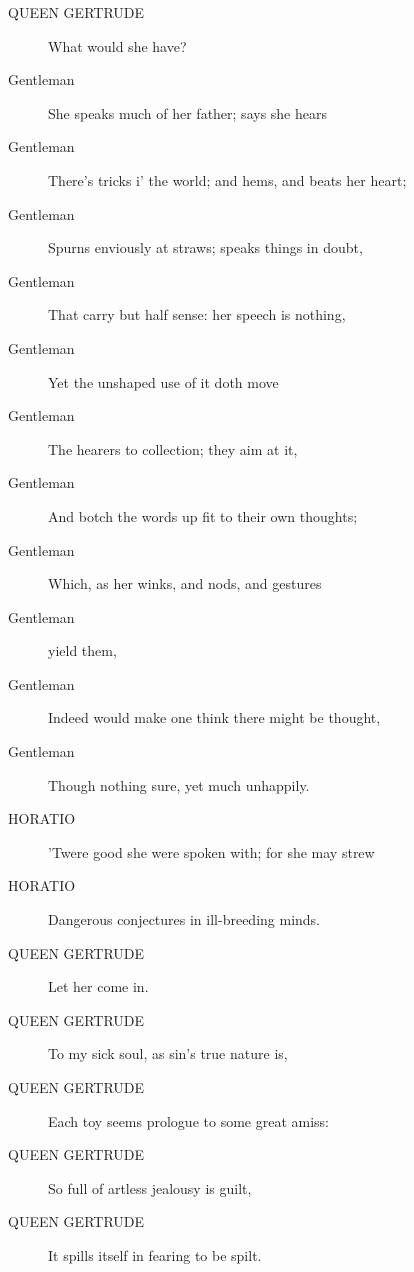 \documentclass{article}
\begin{document}
\begin{description}
            
\item[QUEEN GERTRUDE] What would she have?
\end{description}
          
\begin{description}
            
\item[Gentleman] She speaks much of her father; says she hears
\item[Gentleman] There's tricks i' the world; and hems, and beats her heart;
\item[Gentleman] Spurns enviously at straws; speaks things in doubt,
\item[Gentleman] That carry but half sense: her speech is nothing,
\item[Gentleman] Yet the unshaped use of it doth move
\item[Gentleman] The hearers to collection; they aim at it,
\item[Gentleman] And botch the words up fit to their own thoughts;
\item[Gentleman] Which, as her winks, and nods, and gestures
\item[Gentleman] yield them,
\item[Gentleman] Indeed would make one think there might be thought,
\item[Gentleman] Though nothing sure, yet much unhappily.
\end{description}
          
\begin{description}
            
\item[HORATIO] 'Twere good she were spoken with; for she may strew
\item[HORATIO] Dangerous conjectures in ill-breeding minds.
\end{description}
          
\begin{description}
            
\item[QUEEN GERTRUDE] Let her come in.
\item[QUEEN GERTRUDE] To my sick soul, as sin's true nature is,
\item[QUEEN GERTRUDE] Each toy seems prologue to some great amiss:
\item[QUEEN GERTRUDE] So full of artless jealousy is guilt,
\item[QUEEN GERTRUDE] It spills itself in fearing to be spilt.
\end{description}
          
\end{document}
